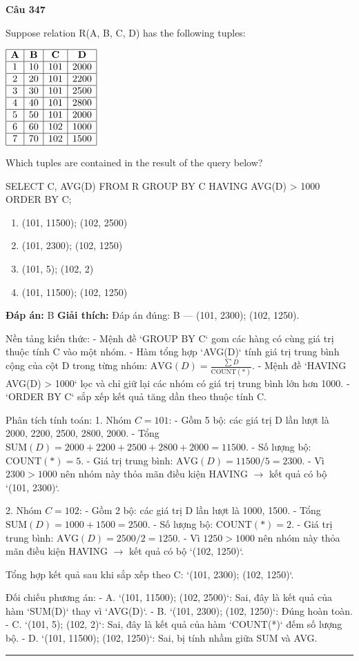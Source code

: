 \documentclass[11pt,a4paper]{article}
\newenvironment{question}[1]{%
  \par\vspace{1em}\noindent\textbf{\large Câu #1}\par\vspace{0.4em}
}{%
  \par\vspace{1em}\hrule\vspace{0.6em}
}
\newenvironment{choices}{%
  \begin{enumerate}[label=\textbf{\Alph*.},leftmargin=2.2em,itemsep=2pt,topsep=3pt]
}{%
  \end{enumerate}
}
\newcommand{\choice}{\item}
\begin{document}
\begin{question}{347}
Suppose relation R(A, B, C, D) has the following tuples:

\(\begin{array}{|c|c|c|c|}
\hline
\textbf{A} & \textbf{B} & \textbf{C} & \textbf{D} \\
\hline
1 & 10 & 101 & 2000 \\
\hline
2 & 20 & 101 & 2200 \\
\hline
3 & 30 & 101 & 2500 \\
\hline
4 & 40 & 101 & 2800 \\
\hline
5 & 50 & 101 & 2000 \\
\hline
6 & 60 & 102 & 1000 \\
\hline
7 & 70 & 102 & 1500 \\
\hline
\end{array}\)

Which tuples are contained in the result of the query below?

SELECT C, AVG(D)
FROM R
GROUP BY C
HAVING AVG(D) > 1000
ORDER BY C;

\begin{choices}
\choice (101, 11500); (102, 2500)
\choice (101, 2300); (102, 1250)
\choice (101, 5); (102, 2)
\choice (101, 11500); (102, 1250)
\end{choices}
\textbf{Đáp án:} B
\textbf{Giải thích:} Đáp án đúng: B — (101, 2300); (102, 1250).

Nền tảng kiến thức:
- Mệnh đề `GROUP BY C` gom các hàng có cùng giá trị thuộc tính C vào một nhóm.
- Hàm tổng hợp `AVG(D)` tính giá trị trung bình cộng của cột D trong từng nhóm: $\text{AVG}(D) = \frac{\sum D}{\text{COUNT}(*)}$.
- Mệnh đề `HAVING AVG(D) > 1000` lọc và chỉ giữ lại các nhóm có giá trị trung bình lớn hơn 1000.
- `ORDER BY C` sắp xếp kết quả tăng dần theo thuộc tính C.

Phân tích tính toán:
1. Nhóm $C = 101$:
   - Gồm 5 bộ: các giá trị D lần lượt là 2000, 2200, 2500, 2800, 2000.
   - Tổng $\text{SUM}(D) = 2000 + 2200 + 2500 + 2800 + 2000 = 11500$.
   - Số lượng bộ: $\text{COUNT}(*) = 5$.
   - Giá trị trung bình: $\text{AVG}(D) = 11500 / 5 = 2300$.
   - Vì $2300 > 1000$ nên nhóm này thỏa mãn điều kiện HAVING $\rightarrow$ kết quả có bộ `(101, 2300)`.

2. Nhóm $C = 102$:
   - Gồm 2 bộ: các giá trị D lần lượt là 1000, 1500.
   - Tổng $\text{SUM}(D) = 1000 + 1500 = 2500$.
   - Số lượng bộ: $\text{COUNT}(*) = 2$.
   - Giá trị trung bình: $\text{AVG}(D) = 2500 / 2 = 1250$.
   - Vì $1250 > 1000$ nên nhóm này thỏa mãn điều kiện HAVING $\rightarrow$ kết quả có bộ `(102, 1250)`.

Tổng hợp kết quả sau khi sắp xếp theo C: `(101, 2300); (102, 1250)`.

Đối chiếu phương án:
- A. `(101, 11500); (102, 2500)`: Sai, đây là kết quả của hàm `SUM(D)` thay vì `AVG(D)`.
- B. `(101, 2300); (102, 1250)`: Đúng hoàn toàn.
- C. `(101, 5); (102, 2)`: Sai, đây là kết quả của hàm `COUNT(*)` đếm số lượng bộ.
- D. `(101, 11500); (102, 1250)`: Sai, bị tính nhầm giữa SUM và AVG.
\end{question}
\end{document}
